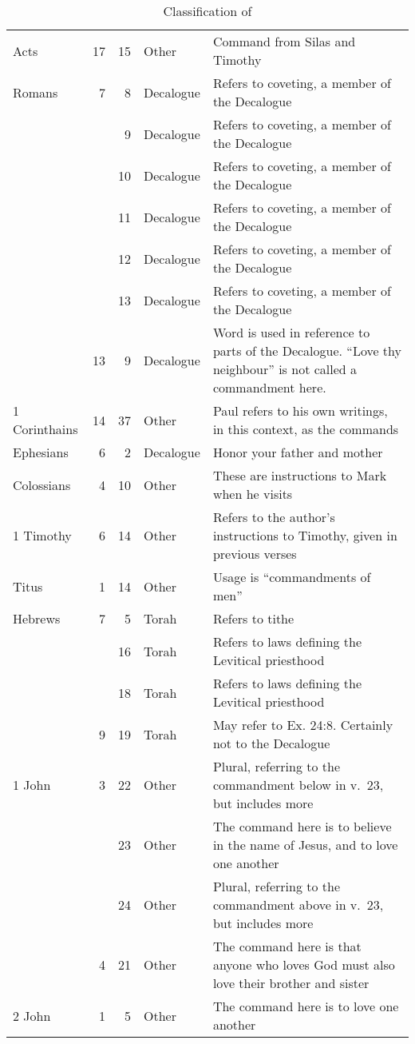\documentclass{article}
\newcommand{\entole}{\textepsilon\textnu\texttau\textomikron\textlambda\textepsilon\xspace}
\begin{document}
\begin{table}
\begin{tabularx}{\textwidth+40pt}{@{}lrrlX@{}}
    Acts&17&15 & Other & Command from Silas and Timothy\\
    Romans&7&8 & Decalogue & Refers to coveting, a member of the Decalogue\\
    & &9 & Decalogue & Refers to coveting, a member of the Decalogue\\
    & &10 & Decalogue & Refers to coveting, a member of the Decalogue\\
    & &11 & Decalogue & Refers to coveting, a member of the Decalogue\\
    & &12 & Decalogue & Refers to coveting, a member of the Decalogue\\
    & &13 & Decalogue & Refers to coveting, a member of the Decalogue\\
    &13&9 & Decalogue & Word is used in reference to parts of the Decalogue.  ``Love thy neighbour'' is not called a commandment here.\\
    1 Corinthains&14&37 & Other & Paul refers to his own writings, in this context, as the commands\\
    Ephesians &6&2 & Decalogue & Honor your father and mother\\
    Colossians&4&10 & Other & These are instructions to Mark when he visits\\
    1 Timothy &6&14 & Other & Refers to the author's instructions to Timothy, given in previous verses\\
    Titus&1&14 & Other & Usage is ``commandments of men''\\
    Hebrews&7&5 & Torah & Refers to tithe\\
    & &16 & Torah & Refers to laws defining the Levitical priesthood\\
    & &18 & Torah & Refers to laws defining the Levitical priesthood\\
    &9&19 & Torah & May refer to Ex. 24:8.  Certainly not to the Decalogue\\
    1 John&3&22 & Other & Plural, referring to the commandment below in v.\ 23, but includes more\\
    & &23 & Other & The command here is to believe in the name of Jesus, and to love one another\\
    & &24 & Other & Plural, referring to the commandment above in v.\ 23, but includes more\\
    &4&21 & Other & The command here is that anyone who loves God must also love their brother and sister\\
    2 John&1&5 & Other & The command here is to love one another\\
    \bottomrule
\end{tabularx}
    \caption{Classification of \entole}
    \label{known}
\end{table}
\end{document}
